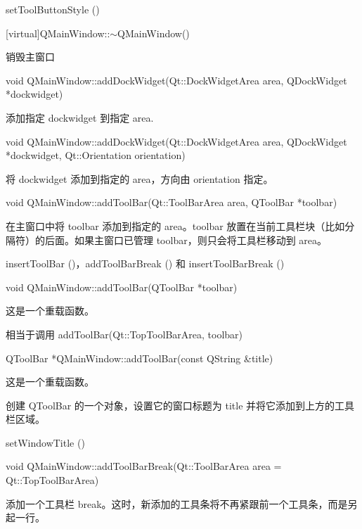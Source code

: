 \begin{notice}[另请参阅]
setToolButtonStyle ()
\end{notice}

\splitLine

[virtual]QMainWindow::$\sim$QMainWindow()

销毁主窗口

\splitLine

void QMainWindow::addDockWidget(Qt::DockWidgetArea area, 
    QDockWidget *dockwidget)

添加指定 dockwidget 到指定 area.

\splitLine

void QMainWindow::addDockWidget(Qt::DockWidgetArea area, QDockWidget *dockwidget, Qt::Orientation orientation)

将 dockwidget 添加到指定的 area，方向由 orientation 指定。

\splitLine

void QMainWindow::addToolBar(Qt::ToolBarArea area, QToolBar *toolbar)

在主窗口中将 toolbar 添加到指定的 area。toolbar 放置在当前工具栏块（比如分隔符）的后面。如果主窗口已管理 toolbar，则只会将工具栏移动到 area。


\begin{notice}[另请参阅]
insertToolBar ()，addToolBarBreak () 和 insertToolBarBreak ()
\end{notice}

\splitLine

void QMainWindow::addToolBar(QToolBar *toolbar)

这是一个重载函数。

相当于调用 addToolBar(Qt::TopToolBarArea, toolbar)

\splitLine

QToolBar *QMainWindow::addToolBar(const QString \&title)

这是一个重载函数。

创建 QToolBar 的一个对象，设置它的窗口标题为 title 并将它添加到上方的工具栏区域。

\begin{notice}[另请参阅]
setWindowTitle ()
\end{notice}

\splitLine

void QMainWindow::addToolBarBreak(Qt::ToolBarArea area = Qt::TopToolBarArea)

添加一个工具栏 break。这时，新添加的工具条将不再紧跟前一个工具条，而是另起一行。

\splitLine


